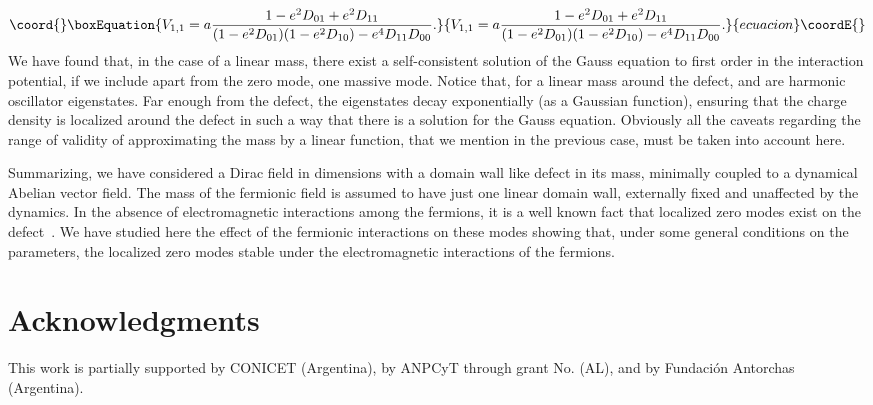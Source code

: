 \documentclass[a4paper,12pt]{article}
\begin{document}
{{\begin{equation}\coord{}\boxEquation{
V_{1,1}=a\frac{1-e^2D_{01}+e^2D_{11}}
{(1-e^2D_{01})(1-e^2D_{10})-e^4D_{11}D_{00}}.
}{
V_{1,1}=a\frac{1-e^2D_{01}+e^2D_{11}}
{(1-e^2D_{01})(1-e^2D_{10})-e^4D_{11}D_{00}}.
}{ecuacion}\coordE{}\end{equation}
We have found that, in the case of a linear mass, there exist a
self-consistent solution of the Gauss equation to first order in the
interaction potential, if we include apart from the zero mode, one
massive mode.  Notice that, for a linear mass around the defect,
\coordHE{} and \coordHE{} are harmonic oscillator eigenstates.
Far enough from the defect, the eigenstates decay exponentially (as a
Gaussian function), ensuring that the charge density is localized
around the defect in such a way that there is a solution for the Gauss
equation.  Obviously all the caveats regarding the range of validity
of approximating the mass by a linear function, that we mention in the
previous case, must be taken into account here.


Summarizing, we have considered a Dirac field in \coordHE{} dimensions with
a domain wall like defect in its mass, minimally coupled to a
dynamical Abelian vector field.  The mass of the fermionic field is
assumed to have just one linear domain wall, externally fixed and
unaffected by the dynamics.  In the absence of electromagnetic
interactions among the fermions, it is a well known fact that
localized zero modes exist on the defect~\cite{ch}. We have studied
here the effect of the fermionic interactions on these modes showing
that, under some general conditions on the parameters, the localized
zero modes stable under the electromagnetic interactions of the
fermions.

\section*{Acknowledgments}

This work is partially supported by CONICET (Argentina), by ANPCyT
through grant No.\coordHE{} (AL), and by Fundaci{\'o}n Antorchas
(Argentina).

}}
\end{document}
